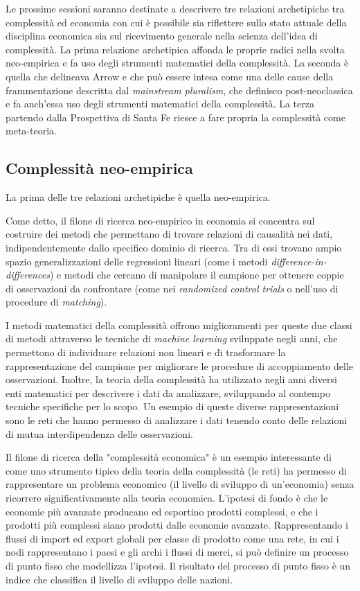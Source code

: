 \documentclass[a4paper, headings=standardclasses]{scrartcl}
\begin{document}
Le prossime sessioni saranno destinate a descrivere tre relazioni archetipiche tra complessità ed economia con cui è possibile sia riflettere sullo stato attuale della disciplina economica sia sul ricevimento generale nella scienza dell'idea di complessità.
La prima relazione archetipica  affonda le proprie radici nella svolta neo-empirica e fa uso degli strumenti matematici della complessità. La seconda è quella che delineava Arrow e che può essere intesa come una delle cause della frammentazione descritta dal \textit{mainstream pluralism}, che definisco post-neoclassica e fa anch'essa uso degli strumenti matematici della complessità.
La terza partendo dalla Prospettiva di Santa Fe riesce a fare propria la complessità come meta-teoria.

\subsection{Complessità neo-empirica}
La prima delle tre relazioni archetipiche è quella neo-empirica.

Come detto, il filone di ricerca neo-empirico in economia si concentra sul costruire dei metodi che permettano di trovare relazioni di causalità nei dati, indipendentemente dallo specifico dominio di ricerca. Tra di essi trovano ampio spazio generalizzazioni delle regressioni lineari (come i metodi \textit{difference-in-differences}) e metodi che cercano di manipolare il campione per ottenere coppie di osservazioni da confrontare (come nei \textit{randomized control trials} o nell'uso di procedure di \textit{matching}).

I metodi matematici della complessità offrono miglioramenti per queste due classi di metodi attraverso le tecniche di \textit{machine learning} sviluppate negli anni, che permettono di individuare relazioni non lineari e di trasformare la rappresentazione del campione per migliorare le procedure di accoppiamento delle osservazioni.
Inoltre, la teoria della complessità ha utilizzato negli anni diversi enti matematici per descrivere i dati da analizzare, sviluppando al contempo tecniche specifiche per lo scopo.
Un esempio di queste diverse rappresentazioni sono le reti che hanno permesso di analizzare i dati tenendo conto delle relazioni di mutua interdipendenza delle osservazioni. 

Il filone di ricerca della "complessità economica" \parencite{hidalgo2021} è un esempio interessante di come uno strumento tipico della teoria della complessità (le reti) ha permesso di rappresentare un problema economico (il livello di sviluppo di un'economia) senza ricorrere significativamente alla teoria economica.
L'ipotesi di fondo è che le economie più avanzate producano ed esportino prodotti complessi, e che i prodotti più complessi siano prodotti dalle economie avanzate.
Rappresentando i flussi di import ed export globali per classe di prodotto come una rete, in cui i nodi rappresentano i paesi e gli archi i flussi di merci, si può definire un processo di punto fisso che modellizza l'ipotesi.
Il risultato del processo di punto fisso è un indice che classifica il livello di sviluppo delle nazioni.
\end{document}
